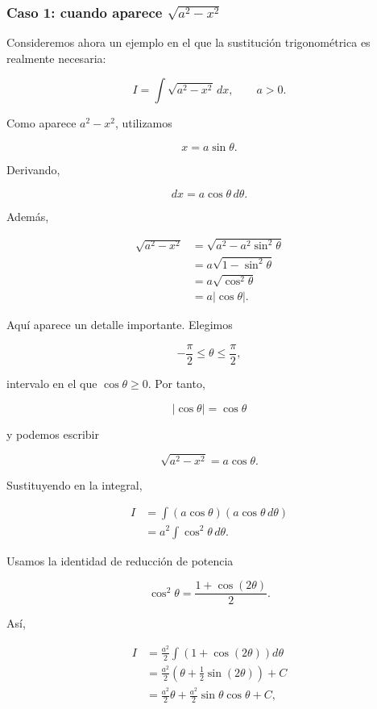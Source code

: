 \subsubsection*{Caso 1: cuando aparece \(\sqrt{a^2-x^2}\)}

Consideremos ahora un ejemplo en el que la sustitución trigonométrica es
realmente necesaria:

\[
I=\int\sqrt{a^2-x^2}\,dx,\qquad a>0.
\]

Como aparece $a^2-x^2$, utilizamos

\[
\boxed{x=a\sin\theta}.
\]

Derivando,

\[
dx=a\cos\theta\,d\theta.
\]

Además,

\begin{align*}
\sqrt{a^2-x^2}
&=\sqrt{a^2-a^2\sin^2\theta}\\
&=a\sqrt{1-\sin^2\theta}\\
&=a\sqrt{\cos^2\theta}\\
&=a|\cos\theta|.
\end{align*}

Aquí aparece un detalle importante. Elegimos

\[
-\frac{\pi}{2}\leq\theta\leq\frac{\pi}{2},
\]

intervalo en el que $\cos\theta\geq0$. Por tanto,

\[
|\cos\theta|=\cos\theta
\]

y podemos escribir

\[
\sqrt{a^2-x^2}=a\cos\theta.
\]

Sustituyendo en la integral,

\begin{align*}
I
&=\int(a\cos\theta)(a\cos\theta\,d\theta)\\
&=a^2\int\cos^2\theta\,d\theta.
\end{align*}

Usamos la identidad de reducción de potencia

\[
\cos^2\theta=\frac{1+\cos(2\theta)}{2}.
\]

Así,

\begin{align*}
I
&=\frac{a^2}{2}\int\left(1+\cos(2\theta)\right)d\theta\\
&=\frac{a^2}{2}\left(\theta+\frac12\sin(2\theta)\right)+C\\
&=\frac{a^2}{2}\theta+
\frac{a^2}{2}\sin\theta\cos\theta+C,
\end{align*}

